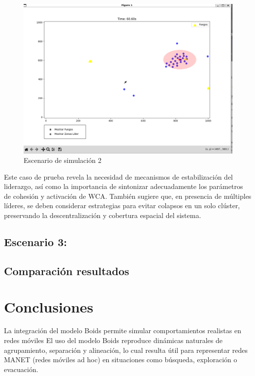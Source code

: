 \documentclass{article}
\begin{document}
\begin{figure}
    \centering
    \includegraphics[width=1\linewidth]{escenario2.png}
    \caption{Escenario de simulación 2}
    \label{fig:enter-label}
\end{figure}

\noindent Este caso de prueba revela la necesidad de mecanismos de estabilización del liderazgo, así como la importancia de sintonizar adecuadamente los parámetros de cohesión y activación de WCA. También sugiere que, en presencia de múltiples líderes, se deben considerar estrategias para evitar colapsos en un solo clúster, preservando la descentralización y cobertura espacial del sistema.

\subsection{Escenario 3:}

\subsection{Comparación resultados}


\section{Conclusiones}\label{sec:concl}

La integración del modelo Boids permite simular comportamientos realistas en redes móviles
El uso del modelo Boids reproduce dinámicas naturales de agrupamiento, separación y alineación, lo cual resulta útil para representar redes MANET (redes móviles ad hoc) en situaciones como búsqueda, exploración o evacuación.
\end{document}
